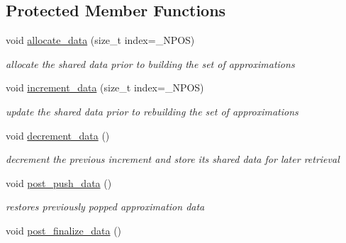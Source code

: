 \subsection*{Protected Member Functions}
\begin{DoxyCompactItemize}
\item 
void \hyperlink{classPecos_1_1SharedInterpPolyApproxData_af8c5dd497976d775d2c600c9950f6b2e}{allocate\+\_\+data} (size\+\_\+t index=\+\_\+\+N\+P\+OS)\label{classPecos_1_1SharedInterpPolyApproxData_af8c5dd497976d775d2c600c9950f6b2e}

\begin{DoxyCompactList}\small\item\em allocate the shared data prior to building the set of approximations \end{DoxyCompactList}\item 
void \hyperlink{classPecos_1_1SharedInterpPolyApproxData_a4890d7d6305c020f7b6885b46760bc1f}{increment\+\_\+data} (size\+\_\+t index=\+\_\+\+N\+P\+OS)\label{classPecos_1_1SharedInterpPolyApproxData_a4890d7d6305c020f7b6885b46760bc1f}

\begin{DoxyCompactList}\small\item\em update the shared data prior to rebuilding the set of approximations \end{DoxyCompactList}\item 
void \hyperlink{classPecos_1_1SharedInterpPolyApproxData_a60174b370eea362e66f5e90876f3c1be}{decrement\+\_\+data} ()\label{classPecos_1_1SharedInterpPolyApproxData_a60174b370eea362e66f5e90876f3c1be}

\begin{DoxyCompactList}\small\item\em decrement the previous increment and store its shared data for later retrieval \end{DoxyCompactList}\item 
void \hyperlink{classPecos_1_1SharedInterpPolyApproxData_ac19cc0185f757af210f8bc3a31dc85b7}{post\+\_\+push\+\_\+data} ()\label{classPecos_1_1SharedInterpPolyApproxData_ac19cc0185f757af210f8bc3a31dc85b7}

\begin{DoxyCompactList}\small\item\em restores previously popped approximation data \end{DoxyCompactList}\item 
void \hyperlink{classPecos_1_1SharedInterpPolyApproxData_a627c3fbb950715823e57acd6bfa0fd72}{post\+\_\+finalize\+\_\+data} ()\label{classPecos_1_1SharedInterpPolyApproxData_a627c3fbb950715823e57acd6bfa0fd72}


\end{DoxyCompactItemize}
